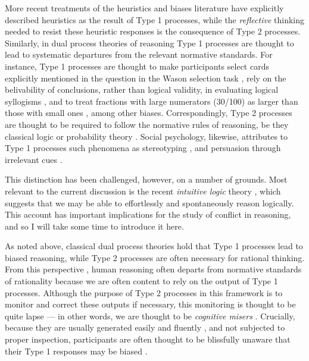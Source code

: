 More recent treatments of the heuristics and biases literature
\citep{Kahneman2005,Kahneman2002,Kahneman2011}
have explicitly described heuristics as the result of Type 1 processes,
while the \emph{reflective} thinking
needed to resist these heuristic responses \citep{Frederick2005}
is the consequence of Type 2 processes.
Similarly, in dual process theories of reasoning
Type 1 processes are thought to lead to systematic departures from
the relevant normative standards.
For instance, Type 1 processes are thought to make participants
select cards explicitly mentioned in the question
in the Wason selection task \citep{Wason1975},
rely on the belivability of conclusions, rather than logical validity,
in evaluating logical syllogisms
\citep[belief bias;][]{Evans1983,Klauer2000},
and to treat fractions with large numerators (30/100)
as larger than those with small ones
\citep[3/10, ratio bias;][]{Kirkpatrick1992}, among other biases.
Correspondingly, Type 2 processes are thought to be required
to follow the normative rules of reasoning,
be they classical logic \citep{Rips1994,Braine1998}
or probability theory \citep{Chater2010,Chater2006}.
Social psychology, likewise,
attributes to Type 1 processes such phenomena as
stereotyping
\citep{Mason2006,Greenwald1995},
and persuasion through irrelevant cues
\citep{Petty1996,Chaiken1987,Petty1986,Chaiken1980}.


This distinction has been challenged, however, on a number of grounds.
Most relevant to the current discussion is
the recent \emph{intuitive logic} theory
\citep{DeNeys2012, DeNeys2014a},
which suggests that we may be able to effortlessly
and spontaneously reason logically.
This account has important implications for the study
of conflict in reasoning,
and so I will take some time to introduce it here.

As noted above, classical dual process theories
hold that Type 1 processes lead to biased reasoning,
while Type 2 processes are often necessary for rational thinking.
From this perspective \citep[i.e.][]{Evans2006},
human reasoning often departs from normative standards of rationality
because we are often content to rely on the output of Type 1 processes.
Although the purpose of Type 2 processes in this framework
is to monitor and correct these outputs if necessary,
this monitoring is thought to be quite lapse ---
in other words, we are thought to be \emph{cognitive misers} \citep{Fiske1991}.
Crucially, because they are usually generated easily and fluently
\citep{Thompson2013,Thompson2012a},
and not subjected to proper inspection,
participants are often thought to be
blissfully unaware that their Type 1 responses may be biased
\citep[see][]{Kahneman2005,Kahneman2011}.

